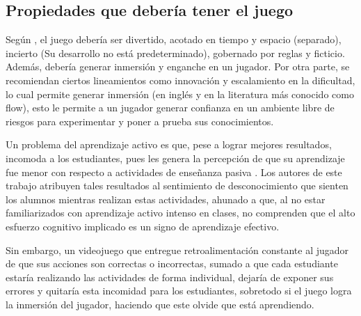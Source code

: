 \documentclass[submission]{eptcs}
\begin{document}
\subsection{Propiedades que debería tener el juego}

Según \cite{evaluation_of_games_for_teaching_cs}, el juego debería ser divertido, acotado en tiempo y espacio (separado), incierto
(Su desarrollo no está predeterminado), gobernado por reglas y ficticio. Además, debería generar inmersión y enganche en un jugador.
Por otra parte, se recomiendan ciertos lineamientos como innovación y escalamiento en la dificultad, lo cual permite generar
inmersión (en inglés y en la literatura más conocido como flow), esto le permite a un jugador generar confianza en
un ambiente libre de riesgos para experimentar y poner a prueba sus conocimientos. 

Un problema del aprendizaje activo es que, pese a lograr mejores resultados, incomoda a los estudiantes, pues les
genera la percepción de que su aprendizaje fue menor con respecto a actividades de enseñanza pasiva \cite{active_learning_versus_feeling_of_learning}.
Los autores de este trabajo atribuyen tales resultados al sentimiento de desconocimiento que sienten los alumnos mientras realizan estas actividades,
ahunado a que, al no estar familiarizados con aprendizaje activo intenso en clases, no comprenden que
el alto esfuerzo cognitivo implicado es un signo de aprendizaje efectivo.

Sin embargo, un videojuego que entregue retroalimentación constante al jugador de que sus acciones
son correctas o incorrectas, sumado a que cada estudiante estaría realizando las actividades
de forma individual, dejaría de exponer sus errores y quitaría esta incomidad para los estudiantes,
sobretodo si el juego logra la inmersión del jugador, haciendo que este olvide que está aprendiendo.






\end{document}
